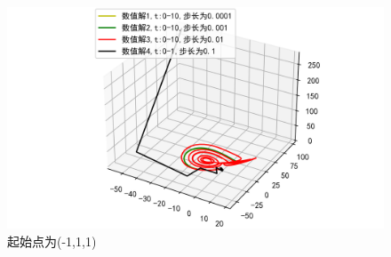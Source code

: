\documentclass[a4paper]{article}%
\begin{document}
\begin{figure}[H]
    \centering
    \includegraphics[scale=0.8]{45}
    \caption{起始点为(-1,1,1)}
\end{figure}
\end{document}
